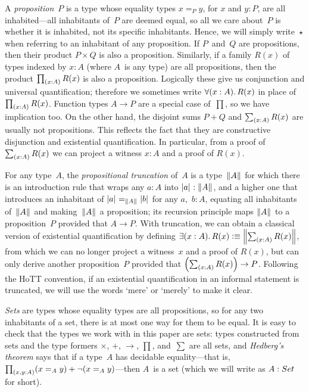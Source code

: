 \documentclass[a4paper,UKenglish,numberwithinsect,cleveref,thm-restate]{lipics-v2021}
\numberwithin{equation}{section}
\theoremstyle{definition}
\theoremstyle{plain}
\begin{document}
A \emph{proposition}~$P$ is a type whose equality types $x =_P y$, for $x$ and $y : P$, are all inhabited---all inhabitants of~$P$ are deemed equal, so all we care about~$P$ is whether it is inhabited, not its specific inhabitants.
Hence, we will simply write~$\star$ when referring to an inhabitant of any proposition.
If $P$~and~$Q$ are propositions, then their product $P \times Q$ is also a proposition.
Similarly, if a family $R(x)$ of types indexed by $x : A$ (where $A$~is any type) are all propositions, then the product $\prd{x : A} R(x)$ is also a proposition.
Logically these give us conjunction and universal quantification; therefore we sometimes write $\fall{x : A} R(x)$ in place of $\prd{x : A} R(x)$.
Function types $A \to P$ are a special case of~$\prod$, so we have implication too.
On the other hand, the disjoint sums $P + Q$ and $\sm{x : A} R(x)$ are usually not propositions.
This reflects the fact that they are constructive disjunction and existential quantification.
In particular, from a proof of $\sm{x : A} R(x)$ we can project a witness $x : A$ and a proof of $R(x)$.

For any type~$A$, the \emph{propositional truncation} of~$A$ is a type~$\mathopen{}\left\Vert A\right\Vert_{}\mathclose{}$ for which there is an introduction rule that wraps any $a : A$ into $\mathopen{}\left|a\right|_{}^{}\mathclose{} : \mathopen{}\left\Vert A\right\Vert_{}\mathclose{}$, and a higher one that introduces an inhabitant of $\mathopen{}\left|a\right|_{}^{}\mathclose{} =_{\mathopen{}\left\Vert A\right\Vert_{}\mathclose{}} \mathopen{}\left|b\right|_{}^{}\mathclose{}$ for any $a$,~$b : A$, equating all inhabitants of~$\mathopen{}\left\Vert A\right\Vert_{}\mathclose{}$ and making~$\mathopen{}\left\Vert A\right\Vert_{}\mathclose{}$ a proposition; its recursion principle maps $\mathopen{}\left\Vert A\right\Vert_{}\mathclose{}$ to a proposition~$P$ provided that $A \to P$.
With truncation, we can obtain a classical version of existential quantification by defining $\exis{x : A} R(x) \defeq \brck{\sm{x : A} R(x)}$, from which we can no longer project a witness~$x$ and a proof of $R(x)$, but can only derive another proposition~$P$ provided that $\left(\sm{x : A} R(x)\right) \to P$.
Following the HoTT convention, if an existential quantification in an informal statement is truncated, we will use the words `mere' or `merely' to make it clear.

\emph{Sets} are types whose equality types are all propositions, so for any two inhabitants of a set, there is at most one way for them to be equal.
It is easy to check that the types we work with in this paper are sets: types constructed from sets and the type formers $\times$, $+$, $\to$, $\prod$, and~$\sum$ are all sets, and \emph{Hedberg's theorem} says that if a type~$A$ has decidable equality---that is, $\prd{x, y : A} (x =_A y) + \neg(x =_A y)$---then $A$~is a set (which we will write as $A : \set$ for short).
\end{document}
